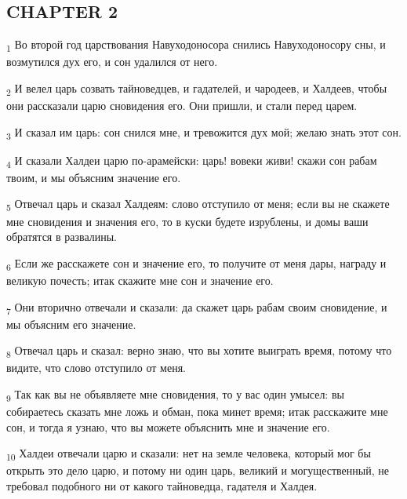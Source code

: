 \subsection{CHAPTER 2}
\begin{tcolorbox}
\textsubscript{1} Во второй год царствования Навуходоносора снились Навуходоносору сны, и возмутился дух его, и сон удалился от него.
\end{tcolorbox}
\begin{tcolorbox}
\textsubscript{2} И велел царь созвать тайноведцев, и гадателей, и чародеев, и Халдеев, чтобы они рассказали царю сновидения его. Они пришли, и стали перед царем.
\end{tcolorbox}
\begin{tcolorbox}
\textsubscript{3} И сказал им царь: сон снился мне, и тревожится дух мой; желаю знать этот сон.
\end{tcolorbox}
\begin{tcolorbox}
\textsubscript{4} И сказали Халдеи царю по-арамейски: царь! вовеки живи! скажи сон рабам твоим, и мы объясним значение его.
\end{tcolorbox}
\begin{tcolorbox}
\textsubscript{5} Отвечал царь и сказал Халдеям: слово отступило от меня; если вы не скажете мне сновидения и значения его, то в куски будете изрублены, и домы ваши обратятся в развалины.
\end{tcolorbox}
\begin{tcolorbox}
\textsubscript{6} Если же расскажете сон и значение его, то получите от меня дары, награду и великую почесть; итак скажите мне сон и значение его.
\end{tcolorbox}
\begin{tcolorbox}
\textsubscript{7} Они вторично отвечали и сказали: да скажет царь рабам своим сновидение, и мы объясним его значение.
\end{tcolorbox}
\begin{tcolorbox}
\textsubscript{8} Отвечал царь и сказал: верно знаю, что вы хотите выиграть время, потому что видите, что слово отступило от меня.
\end{tcolorbox}
\begin{tcolorbox}
\textsubscript{9} Так как вы не объявляете мне сновидения, то у вас один умысел: вы собираетесь сказать мне ложь и обман, пока минет время; итак расскажите мне сон, и тогда я узнаю, что вы можете объяснить мне и значение его.
\end{tcolorbox}
\begin{tcolorbox}
\textsubscript{10} Халдеи отвечали царю и сказали: нет на земле человека, который мог бы открыть это дело царю, и потому ни один царь, великий и могущественный, не требовал подобного ни от какого тайноведца, гадателя и Халдея.
\end{tcolorbox}
